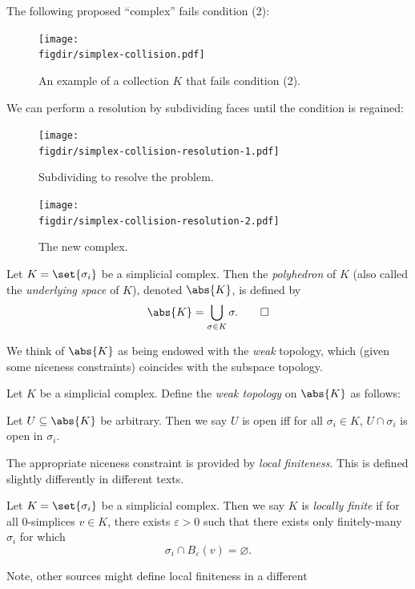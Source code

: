 The following proposed ``complex'' fails condition (2):
\begin{figure}[H]
  \centering
  \texttt{[image: \\figdir/simplex-collision.pdf]}
  \caption{An example of a collection $K$ that fails condition (2).}
\end{figure}
We can perform a resolution by subdividing faces until the condition
is regained:
\begin{figure}[H]
  \centering
  \texttt{[image: \\figdir/simplex-collision-resolution-1.pdf]}
  \caption{Subdividing to resolve the problem.}
\end{figure}
\begin{figure}[H]
  \centering
  \texttt{[image: \\figdir/simplex-collision-resolution-2.pdf]}
  \caption{The new complex.}
\end{figure}
\begin{definition}[Polyhedron]
  Let $K = \set{\sigma_i}$ be a simplicial complex. Then the
  \emph{polyhedron} of $K$ (also called the \emph{underlying space} of
  $K$), denoted $\abs{K}$, is defined by
  \[
    \abs{K} = \bigcup_{\sigma \in K} \sigma. \qedhere
  \]
\end{definition}
We think of $\abs{K}$ as being endowed with the \emph{weak} topology,
which (given some niceness constraints) coincides with the subspace
topology.
\begin{definition}
  Let $K$ be a simplicial complex. Define the \emph{weak topology} on
  $\abs{K}$ as follows:
  \begin{leftbar}
    Let $U \subseteq \abs{K}$ be arbitrary. Then we say $U$ is open
    iff for all $\sigma_i\in K$, $U \cap \sigma_i$ is open in
    $\sigma_i$. \qedhere
  \end{leftbar}
\end{definition}
The appropriate niceness constraint is provided by \emph{local
  finiteness}. This is defined slightly differently in different
texts.
\begin{definition}\label{def:locally-finite}
  Let $K = \set{\sigma_i}$ be a simplicial complex. Then we say $K$ is
  \emph{locally finite} if for all $0$-simplices $v \in K$, there
  exists $\varepsilon > 0$ such that there exists only finitely-many
  $\sigma_i$ for which
  \[
    \sigma_i \cap B_\varepsilon(v) = \varnothing.
  \]
\end{definition}
Note, other sources might define local finiteness in a different
